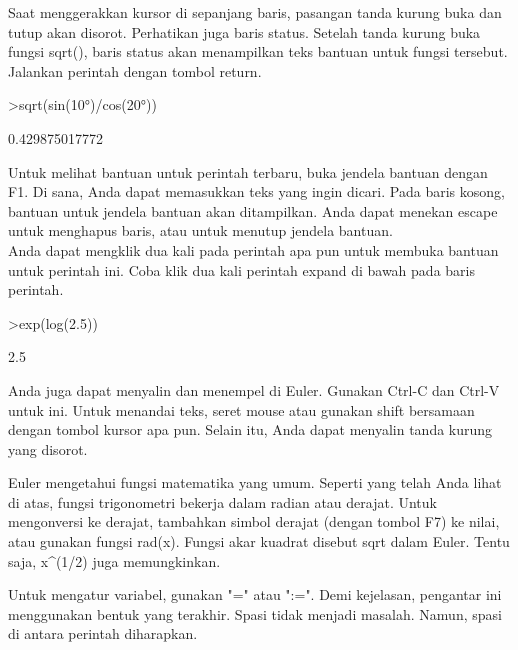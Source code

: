 \documentclass[a4paper,10pt]{article}
\begin{document}
\begin{eulernotebook}
\begin{eulercomment}
Saat menggerakkan kursor di sepanjang baris, pasangan tanda kurung
buka dan tutup akan disorot. Perhatikan juga baris status. Setelah
tanda kurung buka fungsi sqrt(), baris status akan menampilkan teks
bantuan untuk fungsi tersebut. Jalankan perintah dengan tombol return.
\end{eulercomment}
\begin{eulerprompt}
>sqrt(sin(10°)/cos(20°))
\end{eulerprompt}
\begin{euleroutput}
  0.429875017772
\end{euleroutput}
\begin{eulercomment}
Untuk melihat bantuan untuk perintah terbaru, buka jendela bantuan
dengan F1. Di sana, Anda dapat memasukkan teks yang ingin dicari. Pada
baris kosong, bantuan untuk jendela bantuan akan ditampilkan. Anda
dapat menekan escape untuk menghapus baris, atau untuk menutup jendela
bantuan.\\
Anda dapat mengklik dua kali pada perintah apa pun untuk membuka
bantuan untuk perintah ini. Coba klik dua kali perintah expand di
bawah pada baris perintah.
\end{eulercomment}
\begin{eulerprompt}
>exp(log(2.5))
\end{eulerprompt}
\begin{euleroutput}
  2.5
\end{euleroutput}
\begin{eulercomment}
Anda juga dapat menyalin dan menempel di Euler. Gunakan Ctrl-C dan
Ctrl-V untuk ini. Untuk menandai teks, seret mouse atau gunakan shift
bersamaan dengan tombol kursor apa pun. Selain itu, Anda dapat
menyalin tanda kurung yang disorot.
\end{eulercomment}
\begin{eulercomment}

\end{eulercomment}
\begin{eulercomment}
Euler mengetahui fungsi matematika yang umum. Seperti yang telah Anda
lihat di atas, fungsi trigonometri bekerja dalam radian atau derajat.
Untuk mengonversi ke derajat, tambahkan simbol derajat (dengan tombol
F7) ke nilai, atau gunakan fungsi rad(x). Fungsi akar kuadrat disebut
sqrt dalam Euler. Tentu saja, x\textasciicircum{}(1/2) juga memungkinkan.

Untuk mengatur variabel, gunakan "=" atau ":=". Demi kejelasan,
pengantar ini menggunakan bentuk yang terakhir. Spasi tidak menjadi
masalah. Namun, spasi di antara perintah diharapkan.


\end{eulercomment}
\end{eulernotebook}
\end{document}
